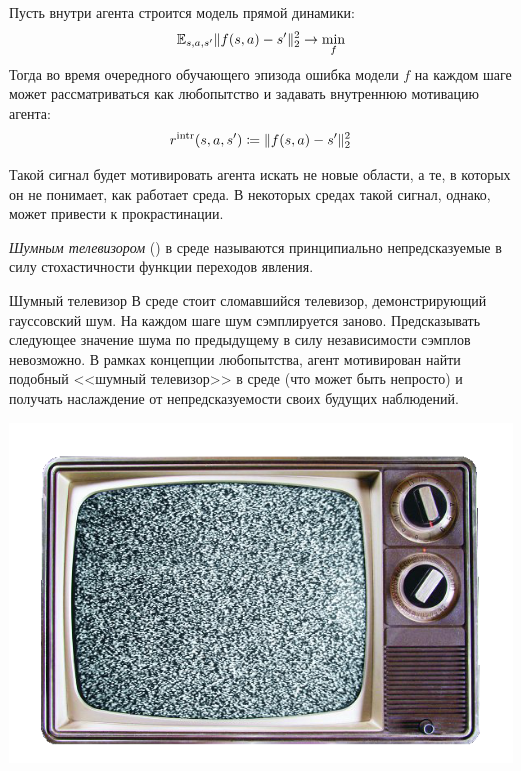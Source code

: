 Пусть внутри агента строится модель прямой динамики:
$$\mathbb{E}_{s,a,s'} \|f(s, a) - s'\|^2_2 \to \min_f$$
Тогда во время очередного обучающего эпизода ошибка модели $f$ на каждом шаге может рассматриваться как любопытство и задавать внутреннюю мотивацию агента:
\begin{equation}\label{curiosity}
r^{\mathrm{intr}}(s, a, s') \coloneqq \|f(s, a) - s'\|^2_2
\end{equation}

Такой сигнал будет мотивировать агента искать не новые области, а те, в которых он не понимает, как работает среда. В некоторых средах такой сигнал, однако, может привести к прокрастинации.

\begin{definition}
\emph{Шумным телевизором} () в среде называются принципиально непредсказуемые в силу стохастичности функции переходов явления.
\end{definition}

\begin{exampleBox}[righthand ratio=0.2, sidebyside, sidebyside align=center, lower separated=false]{Шумный телевизор}
В среде стоит сломавшийся телевизор, демонстрирующий гауссовский шум. На каждом шаге шум сэмплируется заново. Предсказывать следующее значение шума по предыдущему в силу независимости сэмплов невозможно. В рамках концепции любопытства, агент мотивирован найти подобный <<шумный телевизор>> в среде (что может быть непросто) и получать наслаждение от непредсказуемости своих будущих наблюдений.

\tcblower
\includegraphics[width=\textwidth]{Images/noisytv.png}
\end{exampleBox}

